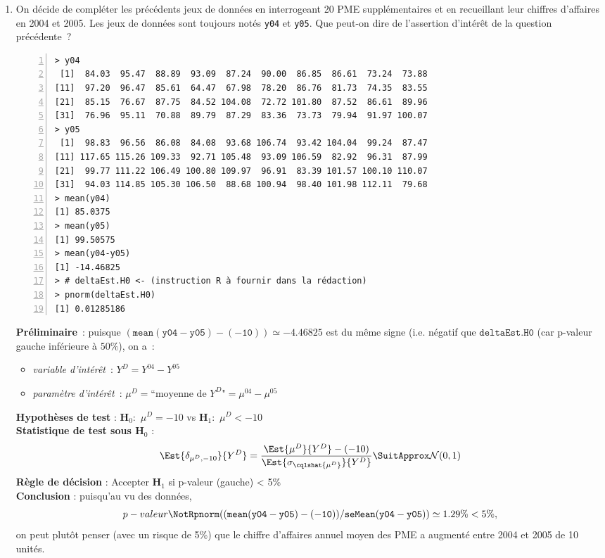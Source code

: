 \documentclass[10pt]{report}
\begin{document}
\begin{exercice}
\begin{enumerate}
\item On décide de compléter les précédents jeux de données en interrogeant 20 PME supplémentaires et en recueillant leur chiffres d'affaires en 2004 et 2005. Les jeux de données sont toujours notés \texttt{y04} et \texttt{y05}. Que peut-on dire de l'assertion d'intérêt de la question précédente~?

\IndicR
\begin{Verbatim}[frame=leftline,fontfamily=tt,fontshape=n,numbers=left]
> y04
 [1]  84.03  95.47  88.89  93.09  87.24  90.00  86.85  86.61  73.24  73.88
[11]  97.20  96.47  85.61  64.47  67.98  78.20  86.76  81.73  74.35  83.55
[21]  85.15  76.67  87.75  84.52 104.08  72.72 101.80  87.52  86.61  89.96
[31]  76.96  95.11  70.88  89.79  87.29  83.36  73.73  79.94  91.97 100.07
> y05
 [1]  98.83  96.56  86.08  84.08  93.68 106.74  93.42 104.04  99.24  87.47
[11] 117.65 115.26 109.33  92.71 105.48  93.09 106.59  82.92  96.31  87.99
[21]  99.77 111.22 106.49 100.80 109.97  96.91  83.39 101.57 100.10 110.07
[31]  94.03 114.85 105.30 106.50  88.68 100.94  98.40 101.98 112.11  79.68
> mean(y04)
[1] 85.0375
> mean(y05)
[1] 99.50575
> mean(y04-y05)
[1] -14.46825
> # deltaEst.H0 <- (instruction R à fournir dans la rédaction)
> pnorm(deltaEst.H0)
[1] 0.01285186
\end{Verbatim}

 

\begin{Correction}
\noindent \textbf{Préliminaire}~: puisque  $\mathtt{(mean(y04-y05)-(-10))}\simeq-4.46825$ est du même signe (i.e. négatif que $\mathtt{deltaEst.H0}$ (car p-valeur gauche inférieure à $50\%$), on a~:
    \begin{itemize}
\item \textit{variable d'intérêt}~: $Y^{D}=Y^{04}-Y^{05}$
\item \textit{paramètre d'intérêt}~: $\mu^{D}=\mbox{``moyenne de $Y^{D}$"}=\mu^{04}-\mu^{05}$
\end{itemize}
\noindent \textbf{Hypothèses de test} : $\mathbf{H}_0:$ $\mu^{D}=-10$ vs {\large $\mathbf{H}_1:$ $\mu^{D}<-10$}\\
\textbf{Statistique de test sous $\mathbf{H}_0$} :
  $$
  \Est{\delta_{\mu^{D},-10}}{Y^{D}}= {\displaystyle \frac{\Est{\mu^{D}}{Y^{D}}-(-10)}{
\Est{\sigma_{\cqlshat{\mu^{D}}}}{Y^{D}}
}} 
  \SuitApprox \mathcal{N}(0,1)
  $$
\textbf{Règle de décision} : Accepter $\mathbf{H}_1$ si 
  p-valeur (gauche) < 5\%\\
\noindent \textbf{Conclusion} :
puisqu'au vu des données, 
  \[
p-valeur\NotR\mathtt{pnorm((mean(y04-y05)-(-10))/seMean(y04-y05))} \simeq 1.29\% < 5\%,
\]
on peut plutôt penser (avec un risque de 5\%) que le chiffre d'affaires annuel moyen des PME a augmenté entre 2004 et 2005 de 10 unités.
\end{Correction}




\end{enumerate}
\end{exercice}
\end{document}
